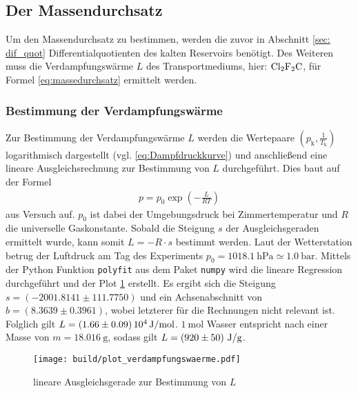 \subsection[]{Der Massendurchsatz}
Um den Massendurchsatz zu bestimmen, werden die zuvor in Abschnitt \ref{sec: dif_quot} Differentialquotienten des kalten Reservoirs benötigt.
Des Weiteren muss die Verdampfungswärme $L$ des Transportmediums, hier: $\ce{Cl2F2C}$, für Formel \eqref{eq:massedurchsatz} ermittelt werden.


\subsubsection[]{Bestimmung der Verdampfungswärme}
Zur Bestimmung der Verdampfungswärme $L$ werden die Wertepaare $\left(p_{\text{k}}, \frac{1}{T_{\text{k}}}\right)$ logarithmisch dargestellt (vgl. \eqref{eq:Dampfdruckkurve})
und anschließend eine lineare Ausgleichsrechnung zur Bestimmung von $L$ durchgeführt.
Dies baut auf der Formel 
\begin{align*}
    p = p_0 \exp{\left(-\frac{L}{RT}\right)}
\end{align*}
aus Versuch \cite[]{man:v203} auf.
$p_0$ ist dabei der Umgebungsdruck bei Zimmertemperatur und $R$ die universelle Gaskonstante.
Sobald die Steigung $s$ der Ausgleichsgeraden ermittelt wurde, kann somit $L = -R \cdot s$ bestimmt werden.
Laut der Wetterstation \cite*[][]{wetterstation} betrug der Luftdruck am Tag des Experiments
$p_0 = \qty[]{1018.1}{\hecto\pascal} \simeq \qty[]{1.0}{\bar}$.
Mittels der Python \cite[]{python} Funktion \texttt{polyfit} aus dem Paket \texttt{numpy} \cite[]{numpy} wird die lineare Regression durchgeführt und
der Plot \ref{fig:ausgleichsgerade} erstellt.
Es ergibt sich die Steigung $s = \left(\num[]{-2001.8141}\pm \num[]{111.7750} \right)$ und ein Achsenabschnitt von 
$b = \left( \num[]{8.3639} \pm \num[]{0.3961} \right)$, 
wobei letzterer für die Rechnungen nicht relevant ist. 
Folglich gilt $L = \left(1.66 \pm 0.09 \right) 10^{4} \, \unit[]{\joule\per\mol}$. 
$\qty[]{1}{\mol}$ Wasser entspricht nach \cite[]{chemie_schule} einer Masse von $m = \qty[]{18.016}{\gram}$, sodass gilt 
$L = \left(920 \pm 50 \right) \, \unit[]{\joule\per\gram}$.
\begin{figure}
    \texttt{[image: build/plot\_verdampfungswaerme.pdf]}
    \caption[]{lineare Ausgleichsgerade zur Bestimmung von $L$}
    \label{fig:ausgleichsgerade}
\end{figure}

